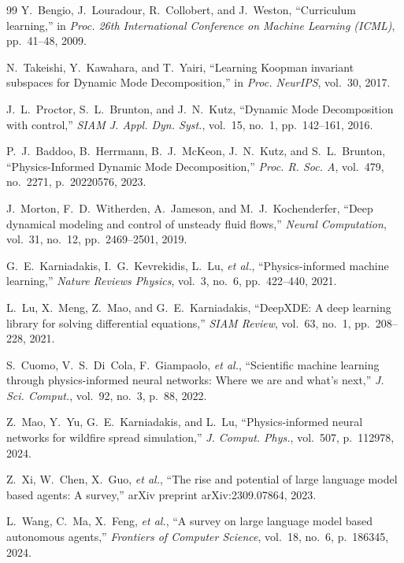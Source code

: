 \documentclass[preprint,times,numbers]{elsarticle}
\begin{document}
\begin{thebibliography}{99}
Y.~Bengio, J.~Louradour, R.~Collobert, and J.~Weston, ``Curriculum learning,'' in \textit{Proc. 26th International Conference on Machine Learning (ICML)}, pp.~41--48, 2009.

N.~Takeishi, Y.~Kawahara, and T.~Yairi, ``Learning Koopman invariant subspaces for Dynamic Mode Decomposition,'' in \textit{Proc. NeurIPS}, vol.~30, 2017.

J.~L.~Proctor, S.~L.~Brunton, and J.~N.~Kutz, ``Dynamic Mode Decomposition with control,'' \textit{SIAM J. Appl. Dyn. Syst.}, vol.~15, no.~1, pp.~142--161, 2016.

P.~J.~Baddoo, B.~Herrmann, B.~J.~McKeon, J.~N.~Kutz, and S.~L.~Brunton, ``Physics-Informed Dynamic Mode Decomposition,'' \textit{Proc. R. Soc. A}, vol.~479, no.~2271, p.~20220576, 2023.

J.~Morton, F.~D.~Witherden, A.~Jameson, and M.~J.~Kochenderfer, ``Deep dynamical modeling and control of unsteady fluid flows,'' \textit{Neural Computation}, vol.~31, no.~12, pp.~2469--2501, 2019.

G.~E.~Karniadakis, I.~G.~Kevrekidis, L.~Lu, \textit{et al.}, ``Physics-informed machine learning,'' \textit{Nature Reviews Physics}, vol.~3, no.~6, pp.~422--440, 2021.

L.~Lu, X.~Meng, Z.~Mao, and G.~E.~Karniadakis, ``DeepXDE: A deep learning library for solving differential equations,'' \textit{SIAM Review}, vol.~63, no.~1, pp.~208--228, 2021.

S.~Cuomo, V.~S.~Di~Cola, F.~Giampaolo, \textit{et al.}, ``Scientific machine learning through physics-informed neural networks: Where we are and what's next,'' \textit{J. Sci. Comput.}, vol.~92, no.~3, p.~88, 2022.

Z.~Mao, Y.~Yu, G.~E.~Karniadakis, and L.~Lu, ``Physics-informed neural networks for wildfire spread simulation,'' \textit{J. Comput. Phys.}, vol.~507, p.~112978, 2024.

Z.~Xi, W.~Chen, X.~Guo, \textit{et al.}, ``The rise and potential of large language model based agents: A survey,'' arXiv preprint arXiv:2309.07864, 2023.

L.~Wang, C.~Ma, X.~Feng, \textit{et al.}, ``A survey on large language model based autonomous agents,'' \textit{Frontiers of Computer Science}, vol.~18, no.~6, p.~186345, 2024.


\end{thebibliography}
\end{document}
